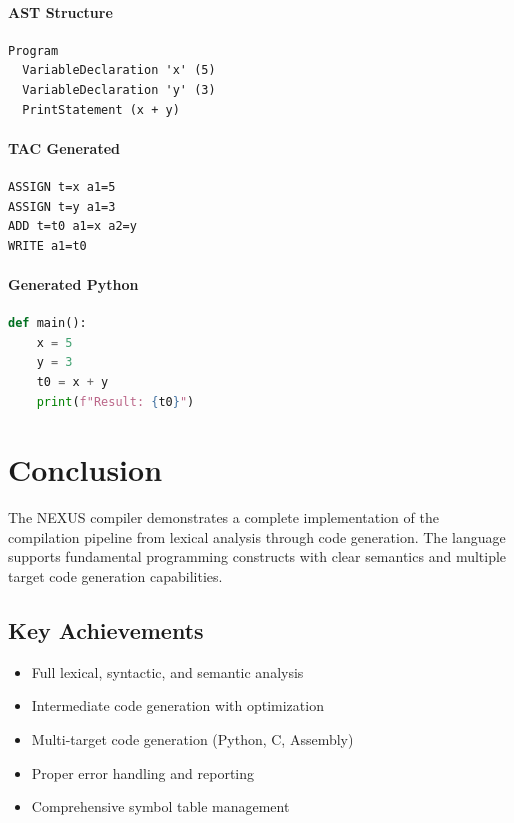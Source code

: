\documentclass[12pt,a4paper]{report}
\begin{document}
\subsubsection{AST Structure}
\begin{verbatim}
Program
  VariableDeclaration 'x' (5)
  VariableDeclaration 'y' (3)
  PrintStatement (x + y)
\end{verbatim}

\subsubsection{TAC Generated}
\begin{verbatim}
ASSIGN t=x a1=5
ASSIGN t=y a1=3
ADD t=t0 a1=x a2=y
WRITE a1=t0
\end{verbatim}

\subsubsection{Generated Python}
\begin{lstlisting}[language=Python]
def main():
    x = 5
    y = 3
    t0 = x + y
    print(f"Result: {t0}")
\end{lstlisting}

\chapter{Conclusion}

The NEXUS compiler demonstrates a complete implementation of the compilation pipeline from lexical analysis through code generation. The language supports fundamental programming constructs with clear semantics and multiple target code generation capabilities.

\section{Key Achievements}

\begin{itemize}
    \item Full lexical, syntactic, and semantic analysis
    \item Intermediate code generation with optimization
    \item Multi-target code generation (Python, C, Assembly)
    \item Proper error handling and reporting
    \item Comprehensive symbol table management
\end{itemize}
\end{document}
